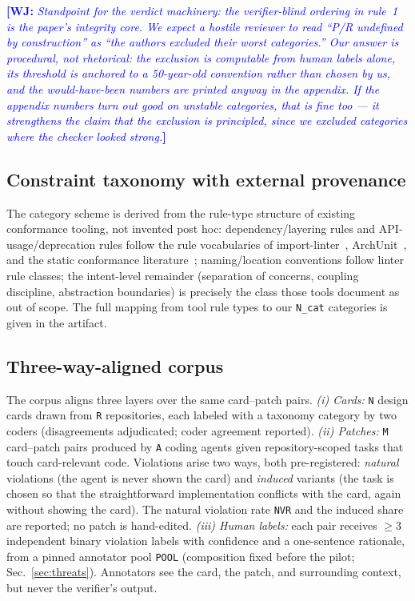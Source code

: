 \documentclass[conference]{IEEEtran}
\newcommand{\wj}[1]{\textcolor{blue}{\textbf{[WJ:} \textit{#1}\textbf{]}}}
\newcommand{\ph}[1]{\colorbox{yellow!35}{\texttt{\footnotesize #1}}}
\begin{document}
\wj{Standpoint for the verdict machinery: the verifier-blind ordering in rule~1
is the paper's integrity core. We expect a hostile reviewer to read
``P/R undefined by construction'' as ``the authors excluded their worst
categories.'' Our answer is procedural, not rhetorical: the exclusion is
computable from human labels alone, its threshold is anchored to a
50-year-old convention rather than chosen by us, and the would-have-been
numbers are printed anyway in the appendix. If the appendix numbers turn out
\emph{good} on unstable categories, that is fine too --- it strengthens the
claim that the exclusion is principled, since we excluded categories where the
checker looked strong.}

\subsection{Constraint taxonomy with external provenance}\label{sec:design:taxonomy}
The category scheme is derived from the rule-type structure of existing
conformance tooling, not invented post hoc: dependency/layering rules and
API-usage/deprecation rules follow the rule vocabularies of
import-linter~\cite{importlinter}, ArchUnit~\cite{archunit}, and the static
conformance literature~\cite{knodel2007comparison,passos2010static};
naming/location conventions follow linter rule classes; the intent-level
remainder (separation of concerns, coupling discipline, abstraction
boundaries) is precisely the class those tools document as out of scope.
The full mapping from tool rule types to our \ph{N\_cat} categories is given in
the artifact.

\subsection{Three-way-aligned corpus}\label{sec:design:corpus}
The corpus aligns three layers over the same card--patch pairs.
\emph{(i) Cards:} \ph{N} design cards drawn from \ph{R} repositories, each
labeled with a taxonomy category by two coders (disagreements adjudicated;
coder agreement reported).
\emph{(ii) Patches:} \ph{M} card--patch pairs produced by \ph{A} coding agents
given repository-scoped tasks that touch card-relevant code. Violations arise
two ways, both pre-registered: \emph{natural} violations (the agent is never
shown the card) and \emph{induced} variants (the task is chosen so that the
straightforward implementation conflicts with the card, again without showing
the card). The natural violation rate \ph{NVR} and the induced share are
reported; no patch is hand-edited.
\emph{(iii) Human labels:} each pair receives $\geq 3$ independent binary
violation labels with confidence and a one-sentence rationale, from a pinned
annotator pool \ph{POOL} (composition fixed before the pilot;
Sec.~\ref{sec:threats}). Annotators see the card, the patch, and surrounding
context, but never the verifier's output.
\end{document}
